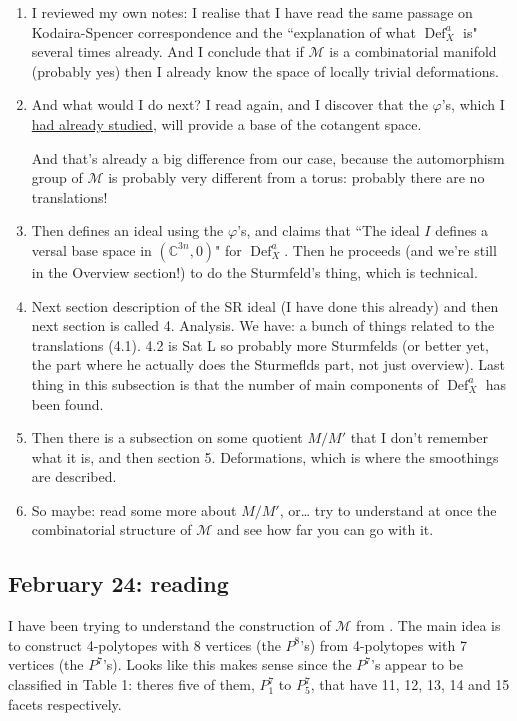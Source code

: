 \begin{enumerate}
\item I reviewed my own notes: I realise that I have read the same passage on Kodaira-Spencer correspondence and the ``explanation of what \(\operatorname{Def}^a_X\) is" several times already. And I conclude that if \(\mathcal{M}\) is a combinatorial manifold (probably yes) then I already know the space of locally trivial deformations.
\item And what would I do next? I read \cite{jan1} again, and I discover that the \(\varphi\)'s, which I \hyperref[varphis]{had already studied}, will provide a base of the cotangent space.

	And that's already a big difference from our case, because the automorphism group of \(\mathcal{M}\) is probably very different from a torus: probably there are no translations!
\item Then  \cite{jan1} defines an ideal using the \(\varphi\)'s, and claims that ``The ideal \(I\) defines a versal base space in \((\mathbb{C}^{3n},0)\)" for \( \operatorname{Def}^a_X\). Then he proceeds (and we're still in the Overview section!) to do the Sturmfeld's thing, which is technical.
\item Next section description of the SR ideal (I have done this already) and then next section is called 4. Analysis. We have: a bunch of things related to the translations (4.1). 4.2 is Sat L so probably more Sturmfelds (or better yet, the part where he actually does the Sturmeflds part, not just overview). Last thing in this subsection is that the number of main components of \(\operatorname{Def}^a_X\) has been found.
\item  Then there is a subsection on some quotient \(M/ M'\) that I don't remember what it is, and then section 5. Deformations, which is where the smoothings are described.
\item So maybe: read some more about \(M/M'\), or… try to understand at once the combinatorial structure of \(\mathcal{M}\) and see how far you can go with it.
\end{enumerate}

\subsection{February 24: reading \cite{grun}}

I have been trying to understand the construction of \(\mathcal{M}\) from \cite{grun}. The main idea is to construct 4-polytopes with 8 vertices (the \(P^8\)'s) from 4-polytopes with 7 vertices (the \(P^7\)'s). Looks like this makes sense since the \(P^7\)'s appear to be classified in Table 1: theres five of them, \(P_1^7\) to \(P_5^7\), that have 11, 12, 13, 14 and 15 facets respectively.

